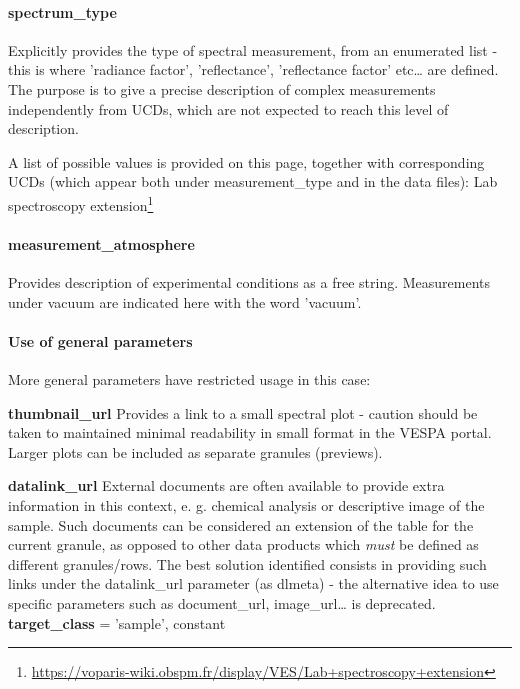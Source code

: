 \documentclass[11pt,a4paper]{ivoa}
\begin{document}
\paragraph{spectrum\_type}

Explicitly provides the type of spectral measurement, from an enumerated list - this is where 'radiance factor', 'reflectance', 'reflectance factor' etc… are defined. The purpose is to give a precise description of complex measurements independently from UCDs, which are not expected to reach this level of description.

A list of possible values is provided on this page, together with corresponding UCDs (which appear both under measurement\_type and in the data files): Lab spectroscopy extension\footnote{\url{https://voparis-wiki.obspm.fr/display/VES/Lab+spectroscopy+extension}}

\paragraph{measurement\_atmosphere}

Provides description of experimental conditions as a free string. Measurements under vacuum are indicated here with the word 'vacuum'.

\paragraph{Use of general parameters}

More general parameters have restricted usage in this case:

\textbf{thumbnail\_url }Provides a link to a small spectral plot - caution should be taken to maintained minimal readability in small format in the VESPA portal. Larger plots can be included as separate granules (previews).

\textbf{datalink\_url} External documents are often available to provide extra information in this context, e. g. chemical analysis or descriptive image of the sample. Such documents can be considered an extension of the table for the current granule, as opposed to other data products which \emph{must} be defined as different granules/rows. The best solution identified consists in providing such links under the datalink\_url parameter (as dlmeta)  - the alternative idea to use specific parameters such as document\_url, image\_url… is deprecated.\\

\textbf{target\_class }= 'sample', constant
\end{document}
